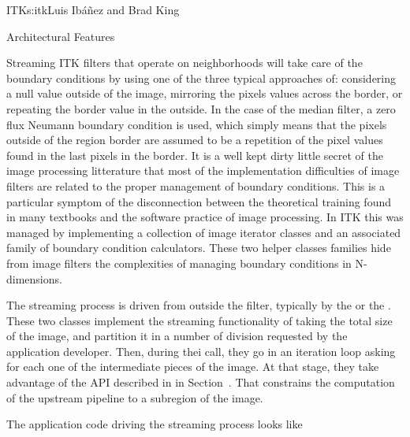\begin{aosachapter}{ITK}{s:itk}{Luis Ib\'{a}\~{n}ez and Brad King}
\begin{aosasect1}{Architectural Features}
\begin{aosasect2}{Streaming}
ITK filters that operate on neighborhoods will take care of the boundary
conditions by using one of the three typical approaches of: considering a null
value outside of the image, mirroring the pixels values across the border, or
repeating the border value in the outside. In the case of the median filter, a
zero flux Neumann boundary condition is used, which simply means that the
pixels outside of the region border are assumed to be a repetition of the pixel
values found in the last pixels in the border. It is a well kept dirty little
secret of the image processing litterature that most of the implementation
difficulties of image filters are related to the proper management of boundary
conditions. This is a particular symptom of the disconnection between the
theoretical training found in many textbooks and the software practice of image
processing.  In ITK this was managed by implementing a collection of image
iterator classes and an associated family of boundary condition calculators.
These two helper classes families hide from image filters the
complexities of managing boundary conditions in N-dimensions.

The streaming process is driven from outside the filter, typically by the
 or the . These two classes
implement the streaming functionality of taking the total size of the image,
and partition it in a number of division requested by the application
developer.  Then, during thei  call, they go in an iteration
loop asking for each one of the intermediate pieces of the image. At that
stage, they take advantage of the  API described in
 in
Section~. That constrains the
computation of the upstream pipeline to a subregion of the image.

The application code driving the streaming process looks like

\begin{aosaitemize}
\item {}
\item {}
\item {}
\item {}
\item {}
\item {}
\end{aosaitemize}


\end{aosasect2}
\end{aosasect1}
\end{aosachapter}
